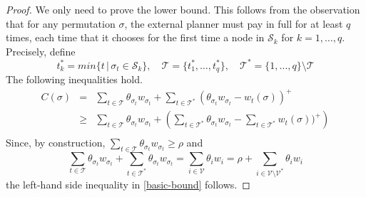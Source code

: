 \documentclass[12pt,twoside,reqno]{amsart}
\theoremstyle{definition}
\numberwithin{equation}{section}
\newcommand{\be}{\begin{equation}}
\newcommand{\ee}{\end{equation}}
\newcommand{\mc}{\mathcal}
\newcommand{\0}{\mathbf{0}}
\newcommand{\1}{\mathbf{1}}
\newcommand{\thre}{\theta}
\newcommand{\threabs}{\theta}
\newcommand{\we}{W^*}
\begin{document}
{\begin{proof} 
We only need to prove the lower bound. This  follows from the observation that for any permutation $\sigma$, the external planner must pay in full for at least $q$ times, each time that it chooses for the first time a node in $\mc S_k$ for $k=1,\dots , q$. 
Precisely, define
$$t^*_k=min\{t\,|\, \sigma_t\in\mc S_k\},\quad \mc T=\{t^*_1,\dots , t^*_q\},\quad \mc T^*=\{1,\dots , q\}\setminus\mc T$$
The following inequalities hold.
$$\begin{array}{rcl}C(\sigma)&=&\sum\limits_{t\in\mc T}\threabs_{\sigma_{t}}w_{\sigma_{t}}+\sum\limits_{t\in\mc T^*}(\threabs_{\sigma_t}w_{\sigma_t}-w_t(\sigma))^+\\ 
&\geq&\sum\limits_{t\in\mc T}\threabs_{\sigma_{t}}w_{\sigma_{t}}+\left(\sum\limits_{t\in\mc T^*}\threabs_{\sigma_t}w_{\sigma_t}- \sum\limits_{t\in\mc T^*}w_t(\sigma))^+\right)\\ 
\end{array}$$
Since, by construction, $\sum\limits_{t\in\mc T}\threabs_{\sigma_{t}}w_{\sigma_{t}}\geq \rho$ and 
$$\sum\limits_{t\in\mc T}\threabs_{\sigma_{t}}w_{\sigma_{t}}+\sum\limits_{t\in\mc T^*}\threabs_{\sigma_t}w_{\sigma_t}=\sum\limits_{i\in\mc V}\threabs_iw_i=\rho+\sum\limits_{i\in\mc V\setminus \mc V^*}\threabs_iw_i$$
the left-hand side inequality in \eqref{basic-bound} follows.
\end{proof}

}
\end{document}
